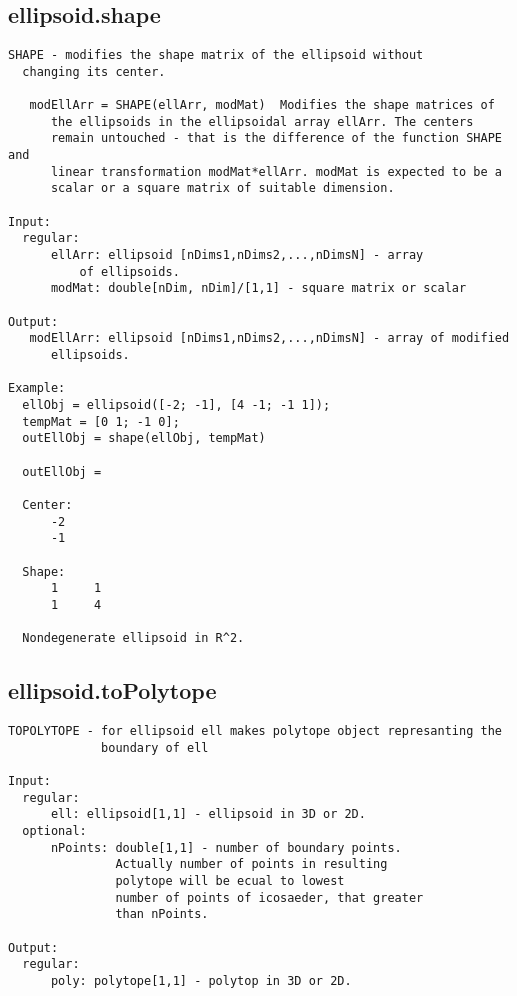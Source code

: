 \subsection{\texorpdfstring{ellipsoid.shape}{shape}}\label{method:ellipsoid.shape}
\begin{verbatim}
SHAPE - modifies the shape matrix of the ellipsoid without
  changing its center.

   modEllArr = SHAPE(ellArr, modMat)  Modifies the shape matrices of
      the ellipsoids in the ellipsoidal array ellArr. The centers
      remain untouched - that is the difference of the function SHAPE and
      linear transformation modMat*ellArr. modMat is expected to be a
      scalar or a square matrix of suitable dimension.

Input:
  regular:
      ellArr: ellipsoid [nDims1,nDims2,...,nDimsN] - array
          of ellipsoids.
      modMat: double[nDim, nDim]/[1,1] - square matrix or scalar

Output:
   modEllArr: ellipsoid [nDims1,nDims2,...,nDimsN] - array of modified
      ellipsoids.

Example:
  ellObj = ellipsoid([-2; -1], [4 -1; -1 1]);
  tempMat = [0 1; -1 0];
  outEllObj = shape(ellObj, tempMat)

  outEllObj =

  Center:
      -2
      -1

  Shape:
      1     1
      1     4

  Nondegenerate ellipsoid in R^2.
\end{verbatim}
\subsection{\texorpdfstring{ellipsoid.toPolytope}{toPolytope}}\label{method:ellipsoid.toPolytope}
\begin{verbatim}
TOPOLYTOPE - for ellipsoid ell makes polytope object represanting the
             boundary of ell

Input:
  regular:
      ell: ellipsoid[1,1] - ellipsoid in 3D or 2D.
  optional:
      nPoints: double[1,1] - number of boundary points.
               Actually number of points in resulting
               polytope will be ecual to lowest
               number of points of icosaeder, that greater
               than nPoints.

Output:
  regular:
      poly: polytope[1,1] - polytop in 3D or 2D.
\end{verbatim}
